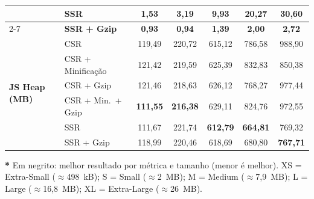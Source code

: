 \begin{table}[!t]
\begin{tabular}{|l|l|c|c|c|c|c|}
  & SSR                       & 1,53  &  3,19 &  9,93 & 20,27  &  30,60 \\ \cline{2-7}
  & \textbf{SSR + Gzip}       & \textbf{0,93} & \textbf{0,94} & \textbf{1,39} & \textbf{2,00} & \textbf{2,72} \\
\hline
\multirow{6}{*}{\textbf{JS Heap (MB)}}
  & CSR                       & 119,49 & 220,72 & 615,12 & 786,58 & 988,90 \\ \cline{2-7}
  & CSR + Minificação         & 121,42 & 219,59 & 625,39 & 832,83 & 850,38 \\ \cline{2-7}
  & CSR + Gzip                & 121,46 & 218,63 & 626,12 & 768,27 & 977,44 \\ \cline{2-7}
  & CSR + Min.\ + Gzip        & \textbf{111,55} & \textbf{216,38} & 629,11 & 824,76 & 972,55 \\ \cline{2-7}
  & SSR                       & 111,67 & 221,74 & \textbf{612,79} & \textbf{664,81} & 769,32 \\ \cline{2-7}
  & SSR + Gzip                & 118,99 & 220,46 & 618,69 & 680,80 & \textbf{767,71} \\
\hline
\end{tabular}
\vspace{2pt}
\begin{flushleft}
\footnotesize
\textbf{*} Em negrito: melhor resultado por métrica e tamanho (menor é melhor).
XS = Extra-Small ($\approx$498~kB); S = Small ($\approx$2~MB); M = Medium ($\approx$7,9~MB); L = Large ($\approx$16,8~MB); XL = Extra-Large ($\approx$26~MB).
\end{flushleft}
\end{table}

